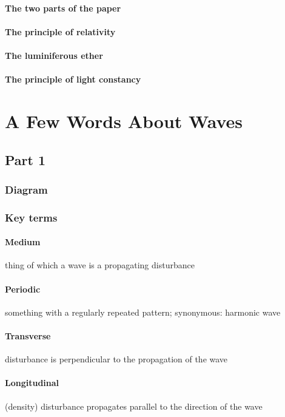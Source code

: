 \documentclass[pagesize,headsepline,10pt,parskip=half]{scrreprt}
\begin{document}
      \paragraph{The two parts of the paper}
      \paragraph{The principle of relativity}
      \paragraph{The luminiferous ether}
      \paragraph{The principle of light constancy}

    \section{A Few Words About Waves}
      \subsection{Part 1}
        \subsubsection{Diagram}
        \subsubsection{Key terms}
          \paragraph{Medium}
            thing of which a wave is a propagating disturbance
          \paragraph{Periodic}
            something with a regularly repeated pattern; synonymous: harmonic wave
          \paragraph{Transverse}
            disturbance is perpendicular to the propagation of the wave
          \paragraph{Longitudinal}
            (density) disturbance propagates parallel to the direction of the wave
\end{document}
